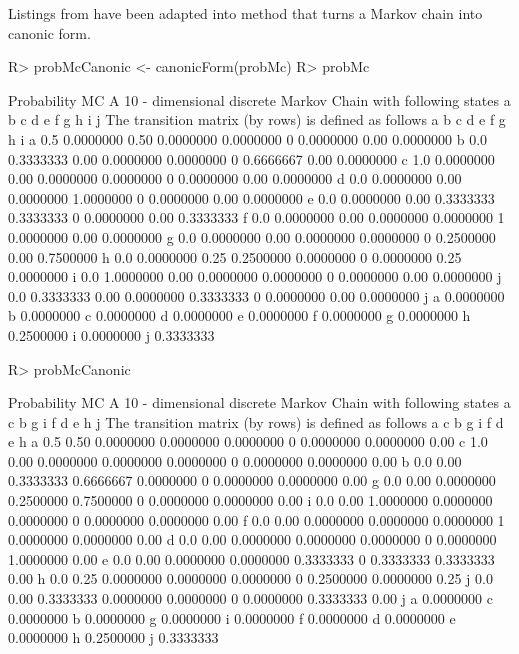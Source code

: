 \documentclass[nojss]{jss}
\begin{document}
Listings from \cite{renaldoMatlab} have been adapted into  method that turns a Markov chain into canonic form.

\begin{Schunk}
\begin{Sinput}
R> probMcCanonic <- canonicForm(probMc)
R> probMc
\end{Sinput}
\begin{Soutput}
Probability MC 
 A  10 - dimensional discrete Markov Chain with following states 
 a b c d e f g h i j 
 The transition matrix   (by rows)  is defined as follows 
    a         b    c         d         e f         g    h         i
a 0.5 0.0000000 0.50 0.0000000 0.0000000 0 0.0000000 0.00 0.0000000
b 0.0 0.3333333 0.00 0.0000000 0.0000000 0 0.6666667 0.00 0.0000000
c 1.0 0.0000000 0.00 0.0000000 0.0000000 0 0.0000000 0.00 0.0000000
d 0.0 0.0000000 0.00 0.0000000 1.0000000 0 0.0000000 0.00 0.0000000
e 0.0 0.0000000 0.00 0.3333333 0.3333333 0 0.0000000 0.00 0.3333333
f 0.0 0.0000000 0.00 0.0000000 0.0000000 1 0.0000000 0.00 0.0000000
g 0.0 0.0000000 0.00 0.0000000 0.0000000 0 0.2500000 0.00 0.7500000
h 0.0 0.0000000 0.25 0.2500000 0.0000000 0 0.0000000 0.25 0.0000000
i 0.0 1.0000000 0.00 0.0000000 0.0000000 0 0.0000000 0.00 0.0000000
j 0.0 0.3333333 0.00 0.0000000 0.3333333 0 0.0000000 0.00 0.0000000
          j
a 0.0000000
b 0.0000000
c 0.0000000
d 0.0000000
e 0.0000000
f 0.0000000
g 0.0000000
h 0.2500000
i 0.0000000
j 0.3333333
\end{Soutput}
\begin{Sinput}
R> probMcCanonic
\end{Sinput}
\begin{Soutput}
Probability MC 
 A  10 - dimensional discrete Markov Chain with following states 
 a c b g i f d e h j 
 The transition matrix   (by rows)  is defined as follows 
    a    c         b         g         i f         d         e    h
a 0.5 0.50 0.0000000 0.0000000 0.0000000 0 0.0000000 0.0000000 0.00
c 1.0 0.00 0.0000000 0.0000000 0.0000000 0 0.0000000 0.0000000 0.00
b 0.0 0.00 0.3333333 0.6666667 0.0000000 0 0.0000000 0.0000000 0.00
g 0.0 0.00 0.0000000 0.2500000 0.7500000 0 0.0000000 0.0000000 0.00
i 0.0 0.00 1.0000000 0.0000000 0.0000000 0 0.0000000 0.0000000 0.00
f 0.0 0.00 0.0000000 0.0000000 0.0000000 1 0.0000000 0.0000000 0.00
d 0.0 0.00 0.0000000 0.0000000 0.0000000 0 0.0000000 1.0000000 0.00
e 0.0 0.00 0.0000000 0.0000000 0.3333333 0 0.3333333 0.3333333 0.00
h 0.0 0.25 0.0000000 0.0000000 0.0000000 0 0.2500000 0.0000000 0.25
j 0.0 0.00 0.3333333 0.0000000 0.0000000 0 0.0000000 0.3333333 0.00
          j
a 0.0000000
c 0.0000000
b 0.0000000
g 0.0000000
i 0.0000000
f 0.0000000
d 0.0000000
e 0.0000000
h 0.2500000
j 0.3333333
\end{Soutput}
\end{Schunk}
\end{document}
